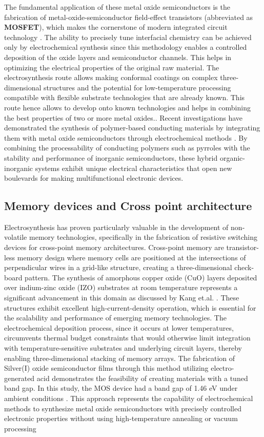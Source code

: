\documentclass[12pt,a4paper]{report}
\begin{document}
	The fundamental application of these metal oxide semiconductors is the fabrication of metal-oxide-semiconductor field-effect transistors (abbreviated as \textbf{MOSFET}), which makes the cornerstone of modern integrated circuit technology \cite{Rajeshwar2023}. The ability to precisely tune interfacial chemistry can be achieved only by electrochemical synthesis since this methodology enables a controlled deposition of the oxide layers and semiconductor channels. This helps in optimizing the electrical properties of the original raw material. The electrosynthesis route allows making conformal coatings on complex three-dimensional structures and the potential for low-temperature processing compatible with flexible substrate technologies that are already known. This route hence allows to develop onto known technologies and helps in combining the best properties of two or more metal oxides.\cite{Tian2015}.
	Recent investigations have demonstrated the synthesis of polymer-based conducting materials by integrating them with metal oxide semiconductors through electrochemical methods \cite{Kou1996}. By combining the processability of conducting polymers such as pyrroles with the stability and performance of inorganic semiconductors, these hybrid organic-inorganic systems exhibit unique electrical characteristics that open new boulevards for making multifunctional electronic devices.
	
	\subsection{Memory devices and Cross point architecture}
	Electrosynthesis has proven particularly valuable in the development of non-volatile memory technologies, specifically in the fabrication of resistive switching devices for cross-point memory architectures. Cross-point memory are transistor-less memory design where memory cells are positioned at the intersections of perpendicular wires in a grid-like structure, creating a three-dimensional check-board pattern. The synthesis of amorphous copper oxide (CuO) layers deposited over indium-zinc oxide (IZO) substrates at room temperature represents a significant advancement in this domain as discussed by Kang et.al. \cite{Kang2008}. These structures exhibit excellent high-current-density operation, which is essential for the scalability and performance of emerging memory technologies. The electrochemical deposition process, since it occurs at lower temperatures, circumvents thermal budget constraints that would otherwise limit integration with temperature-sensitive substrates and underlying circuit layers, thereby enabling three-dimensional stacking of memory arrays.
	The fabrication of Silver(I) oxide semiconductor films through this method utilizing electro-generated acid demonstrates the feasibility of creating materials with a tuned band gap. In this study, the MOS device had a band gap of 1.46 eV under ambient conditions \cite{Ida2008}. This approach represents the capability of electrochemical methods to synthesize metal oxide semiconductors with precisely controlled electronic properties without using high-temperature annealing or vacuum processing
	
\end{document}
